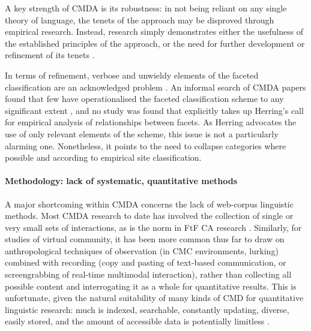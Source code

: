 		 A key strength of CMDA is its robustness: in not being reliant on any single theory of language, the tenets of the approach may be disproved through empirical research. Instead, research simply demonstrates either the usefulness of the established principles of the approach, or the need for further development or refinement of its tenets \cite{herring_computer-mediated_2001}.

		 In terms of refinement, verbose and unwieldy elements of the faceted classification are an acknowledged problem \cite{herring_faceted_2007}. An informal search of CMDA papers found that few have operationalised the faceted classification scheme to any significant extent \cite[e.g.][]{chiluwa_citizenship_2012,lindholm_identity_2012}, and no study was found that explicitly takes up Herring's call for empirical analysis of relationships between facets. As Herring advocates the use of only relevant elements of the scheme, this issue is not a particularly alarming one. Nonetheless, it points to the need to collapse categories where possible and according to empirical site classification.

		  \paragraph{Methodology: lack of systematic, quantitative methods}\label{sect:shortcl}

			A major shortcoming within CMDA concerns the lack of  web-corpus linguistic methods. Most CMDA research to date has involved the collection of single or very small sets of interactions, as is the norm in FtF CA research \cite{androutsopoulos_introduction:_2008}. Similarly, for studies of virtual community, it has been more common thus far to draw on anthropological techniques of observation (in CMC environments, lurking) combined with recording (copy and pasting of text-based communication, or screengrabbing of real-time multimodal interaction), rather than collecting all possible content and interrogating it as a whole for quantitative results. This is unfortunate, given the natural suitability of many kinds of CMD for quantitative linguistic research: much is indexed, searchable, constantly updating, diverse, easily stored, and the amount of accessible data is potentially limitless \cite{baroni_wacky_2009}.


